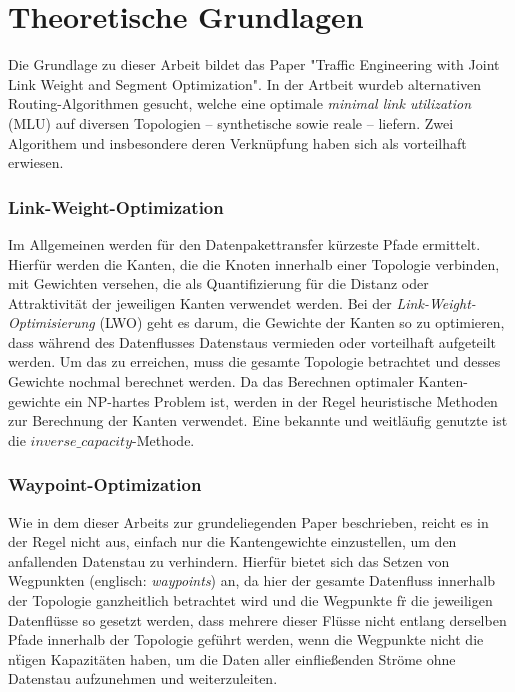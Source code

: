 \documentclass[sigconf, nonacm, review]{acmart}
\begin{document}
\section{Theoretische Grundlagen}
Die Grundlage zu dieser Arbeit bildet das Paper "Traffic Engineering with Joint Link Weight and Segment Optimization"\cite{foerster2021}.
In der Artbeit wurdeb alternativen Routing-Algorithmen gesucht, 
welche eine optimale \emph{minimal link utilization} (MLU) auf diversen Topologien -- synthetische sowie reale -- liefern. 
Zwei Algorithem und insbesondere deren Verkn\"upfung haben sich als vorteilhaft erwiesen.
\subsubsection{Link-Weight-Optimization} 
Im Allgemeinen werden f\"ur den Datenpakettransfer k\"urzeste Pfade ermittelt.
Hierf\"ur werden die Kanten, die die Knoten innerhalb einer Topologie verbinden, 
mit Gewichten versehen, 
die als Quantifizierung f\"ur die Distanz oder Attraktivit\"at der jeweiligen Kanten verwendet werden.
Bei der \emph{Link-Weight-Optimisierung} (LWO) geht es darum, 
die Gewichte der Kanten so zu optimieren, 
dass w\"ahrend des Datenflusses Datenstaus vermieden oder vorteilhaft aufgeteilt werden. 
Um das zu erreichen, 
muss die gesamte Topologie betrachtet und desses Gewichte nochmal berechnet werden.
Da das Berechnen optimaler Kanten-gewichte ein NP-hartes Problem ist,
werden in der Regel heuristische Methoden zur Berechnung der Kanten verwendet.
Eine bekannte und weitl\"aufig genutzte ist die $inverse\_capacity$-Methode.
\subsubsection{Waypoint-Optimization}
Wie in dem dieser Arbeits zur grundeliegenden Paper\cite{foerster2021} beschrieben,
reicht es in der Regel nicht aus, einfach nur die Kantengewichte einzustellen, um den anfallenden Datenstau zu verhindern.
Hierf\"ur bietet sich das Setzen von Wegpunkten (englisch: \emph{waypoints}) an, 
da hier der gesamte Datenfluss innerhalb der Topologie ganzheitlich betrachtet wird 
und die Wegpunkte f\"r die jeweiligen Datenfl\"usse so gesetzt werden, 
dass mehrere dieser Fl\"usse nicht entlang derselben Pfade innerhalb der Topologie gef\"uhrt werden, 
wenn die Wegpunkte nicht die n\"tigen Kapazit\"aten haben, um die Daten aller einflie\ss enden Str\"ome ohne Datenstau aufzunehmen und weiterzuleiten.
\end{document}

